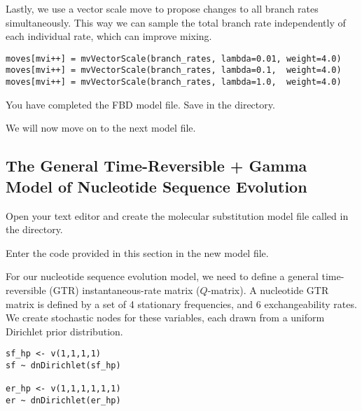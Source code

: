 Lastly, we use a vector scale move to propose changes to all branch rates simultaneously.
This way we can sample the total branch rate independently of each individual rate, which can improve mixing.
{\tt \begin{snugshade*}
\begin{lstlisting}
moves[mvi++] = mvVectorScale(branch_rates, lambda=0.01, weight=4.0) 
moves[mvi++] = mvVectorScale(branch_rates, lambda=0.1,  weight=4.0) 
moves[mvi++] = mvVectorScale(branch_rates, lambda=1.0,  weight=4.0)
\end{lstlisting}
\end{snugshade*}}

{\begin{framed}
You have completed the FBD model file. Save  in the  directory.

We will now move on to the next model file.
\end{framed}}


\bigskip

\subsection{The General Time-Reversible + Gamma Model of Nucleotide Sequence Evolution}\label{subsect:Exercise-ModelGTRG}

{\begin{framed}
Open your text editor and create the molecular substitution model file called {\textcolor{red}{}} in the  directory.

Enter the \Rev code provided in this section in the new model file.
\end{framed}}

For our nucleotide sequence evolution model, we need to define a general time-reversible (GTR) instantaneous-rate matrix (\IE $Q$-matrix).
A nucleotide GTR matrix is defined by a set of 4 stationary frequencies, and 6 exchangeability rates.
We create stochastic nodes for these variables, each drawn from a uniform Dirichlet prior distribution.

{\tt \begin{snugshade*}
\begin{lstlisting}
sf_hp <- v(1,1,1,1)
sf ~ dnDirichlet(sf_hp)

er_hp <- v(1,1,1,1,1,1)
er ~ dnDirichlet(er_hp)
\end{lstlisting}
\end{snugshade*}}

